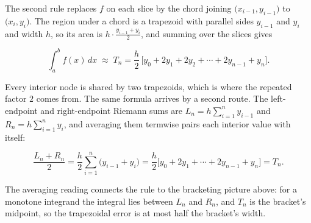 \documentclass[a4paper,12pt,oneside]{memoir}
\begin{document}
The second rule replaces \(f\) on each slice by the chord joining \(\bigl(x_{i-1}, y_{i-1}\bigr)\) to \(\bigl(x_{i}, y_{i}\bigr)\). The region under a chord is a trapezoid with parallel sides \(y_{i-1}\) and \(y_{i}\) and width \(h\), so its area is \(h\cdot\tfrac{y_{i-1} + y_{i}}{2}\), and summing over the slices gives

\[ \int_{a}^{b} f(x)\,dx \;\approx\; T_{n} = \frac{h}{2}\,\bigl[y_{0} + 2y_{1} + 2y_{2} + \cdots + 2y_{n-1} + y_{n}\bigr]. \tag{T} \]

Every interior node is shared by two trapezoids, which is where the repeated factor \(2\) comes from. The same formula arrives by a second route. The left-endpoint and right-endpoint Riemann sums are \(L_{n} = h\sum_{i=1}^{n} y_{i-1}\) and \(R_{n} = h\sum_{i=1}^{n} y_{i}\), and averaging them termwise pairs each interior value with itself:

\[ \frac{L_{n} + R_{n}}{2} = \frac{h}{2}\sum_{i=1}^{n}\bigl(y_{i-1} + y_{i}\bigr) = \frac{h}{2}\bigl[y_{0} + 2y_{1} + \cdots + 2y_{n-1} + y_{n}\bigr] = T_{n}. \]

The averaging reading connects the rule to the bracketing picture above: for a monotone integrand the integral lies between \(L_{n}\) and \(R_{n}\), and \(T_{n}\) is the bracket’s midpoint, so the trapezoidal error is at most half the bracket’s width.
\end{document}
